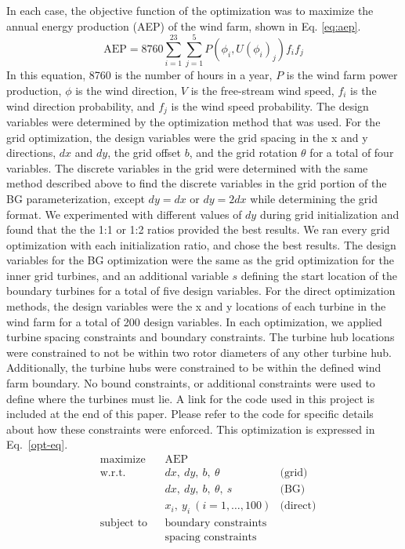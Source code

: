 \documentclass[wes, manuscript]{copernicus}
\begin{document}
In each case, the objective function of the optimization was to maximize the annual energy production (AEP) of the wind farm, shown in Eq. \ref{eq:aep}. 
%
\begin{equation}
\text{AEP} = 8760 \sum_{i=1}^{23}\sum_{j=1}^5P(\phi_i,U(\phi_i)_j)f_if_j
\label{eq:aep}
\end{equation}
%
In this equation, 8760 is the number of hours in a year, $P$ is the wind farm power production, $\phi$ is the wind direction, $V$ is the free-stream wind speed, $f_i$ is the wind direction probability, and $f_j$ is the wind speed probability.
%
The design variables were determined by the optimization method that was used. For the grid optimization, the design variables were the grid spacing in the x and y directions, $dx$ and $dy$, the grid offset $b$, and the grid rotation $\theta$ for a total of four variables. The discrete variables in the grid were determined with the same method described above to find the discrete variables in the grid portion of the BG parameterization, except $dy=dx$ or $dy=2dx$ while determining the grid format. We experimented with different values of $dy$ during grid initialization and found that the the 1:1 or 1:2 ratios provided the best results. We ran every grid optimization with each initialization ratio, and chose the best results. The design variables for the BG optimization were the same as the grid optimization for the inner grid turbines, and an additional variable $s$ defining the start location of the boundary turbines for a total of five design variables. For the direct optimization methods, the design variables were the x and y locations of each turbine in the wind farm for a total of 200 design variables.
%
In each optimization, we applied turbine spacing constraints and boundary constraints. The turbine hub locations were constrained to not be within two rotor diameters of any other turbine hub. Additionally, the turbine hubs were constrained to be within the defined wind farm boundary. No bound constraints, or additional constraints were used to define where the turbines must lie. A link for the code used in this project is included at the end of this paper. Please refer to the code for specific details about how these constraints were enforced. This optimization is expressed in Eq.~\ref{opt-eq}.
%
\begin{equation}
			\begin{aligned}
				& \text{maximize}
					& & \text{AEP} \\
                & \text{w.r.t.} 
                 && dx,~ dy,~b,~ \theta
                 & \text{(grid)}\\
                 &&& dx,~ dy,~b,~ \theta,~ s
                 & \text{(BG)}\\
                	&&& x_i,~ y_i ~ (i = 1, \ldots, 100)
		& \text{(direct)}\\
				& \text{subject to}
					& & \text{boundary constraints} \\
						&&& \text{spacing constraints} \\
			\end{aligned}
		\label{opt-eq}
		\end{equation}
\end{document}
